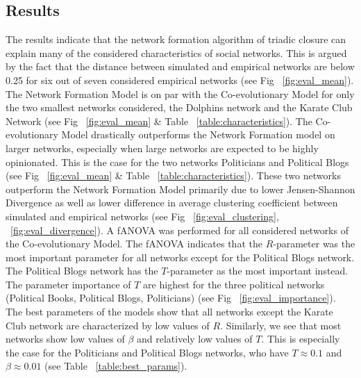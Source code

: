 \documentclass{article}
\begin{document}
\subsection{Results}

The results indicate that the network formation algorithm of triadic closure can explain many of the considered characteristics of social networks. This is argued by the fact that the distance between simulated and empirical networks are below 0.25 for six out of seven considered empirical networks (see Fig ~\ref{fig:eval_mean}). The Network Formation Model is on par with the Co-evolutionary Model for only the two smallest networks considered, the Dolphins network and the Karate Club Network (see Fig ~\ref{fig:eval_mean} \& Table ~\ref{table:characteristics}). The Co-evolutionary Model drastically outperforms the Network Formation model on larger networks, especially when large networks are expected to be highly opinionated. This is the case for the two networks Politicians and Political Blogs (see Fig ~\ref{fig:eval_mean} \& Table ~\ref{table:characteristics}). These two networks outperform the Network Formation Model primarily due to lower Jensen-Shannon Divergence as well as lower difference in average clustering coefficient between simulated and empirical networks (see Fig ~\ref{fig:eval_clustering}, ~\ref{fig:eval_divergence}).  
A fANOVA was performed for all considered networks of the Co-evolutionary Model. The fANOVA indicates that the $R$-parameter was the most important parameter for all networks except for the Political Blogs network. The Political Blogs network has the $T$-parameter as the most important instead. The parameter importance of $T$ are highest for the three political networks (Political Books, Political Blogs, Politicians) (see Fig ~\ref{fig:eval_importance}).
The best parameters of the models show that all networks except the Karate Club network are characterized by low values of $R$. Similarly, we see that most networks show low values of $\beta$ and relatively low values of $T$. This is especially the case for the Politicians and Political Blogs networks, who have $T \approx 0.1$ and $\beta \approx 0.01$ (see Table ~\ref{table:best_params}).  
\end{document}
